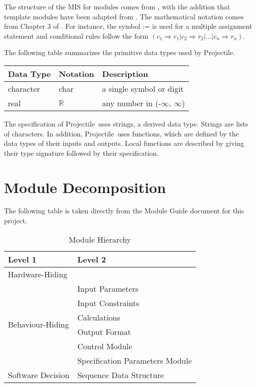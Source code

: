 \documentclass[12pt, titlepage]{article}
\newcommand{\progname}{Projectile}
\begin{document}
The structure of the MIS for modules comes from \citet{HoffmanAndStrooper1995},
with the addition that template modules have been adapted from
\cite{GhezziEtAl2003}.  The mathematical notation comes from Chapter 3 of
\citet{HoffmanAndStrooper1995}.  For instance, the symbol := is used for a
multiple assignment statement and conditional rules follow the form $(c_1
\Rightarrow r_1 | c_2 \Rightarrow r_2 | ... | c_n \Rightarrow r_n )$.

The following table summarizes the primitive data types used by \progname. 

\begin{center}
\renewcommand{\arraystretch}{1.2}
\noindent 
\begin{tabular}{l l p{7.5cm}} 
\toprule 
\textbf{Data Type} & \textbf{Notation} & \textbf{Description}\\ 
\midrule
character & char & a single symbol or digit\\
real & $\mathbb{R}$ & any number in (-$\infty$, $\infty$)\\
\bottomrule
\end{tabular} 
\end{center}

\noindent
The specification of \progname\ uses strings, a derived data type. Strings
are lists of characters. In addition, \progname\ uses functions, which
are defined by the data types of their inputs and outputs. Local functions are
described by giving their type signature followed by their specification.

\newpage
\section{Module Decomposition}

The following table is taken directly from the Module Guide document for this project.

\begin{table}[h!]
\centering
\begin{tabular}{p{} p{}}
\toprule
\textbf{Level 1} & \textbf{Level 2}\\
\midrule

{Hardware-Hiding} & ~ \\
\midrule

\multirow{6}{0.3\textwidth}{Behaviour-Hiding} & Input Parameters\\
& Input Constraints\\
& Calculations\\
& Output Format\\
& Control Module\\
& Specification Parameters Module\\
\midrule

\multirow{1}{0.3\textwidth}{Software Decision} & Sequence Data Structure\\
\bottomrule

\end{tabular}
\caption{Module Hierarchy}
\label{TblMH}
\end{table}
\end{document}
